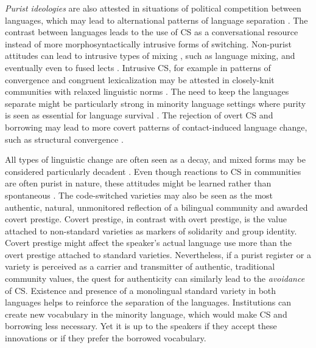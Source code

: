 \documentclass[output=paper,
modfonts
]{langscibook}
\begin{document}
\textit{Purist ideologies} are also attested in situations of political competition between languages, which may lead to alternational patterns of language separation \parencite{muysken2013language}. The contrast between languages leads to the use of CS as a conversational resource \parencite{poplack1988contrasting,auer1999codeswitching} instead of more morphosyntactically intrusive forms of switching. Non-purist attitudes can lead to intrusive types of mixing \parencite{poplack1988contrasting}, such as language mixing, and eventually even to fused lects \parencite{auer1999codeswitching}. Intrusive CS, for example in patterns of convergence and congruent lexicalization may be attested in closely-knit communities with relaxed linguistic norms \parencite{muysken2013language}. The need to keep the languages separate might be particularly strong in minority language settings where purity is seen as essential for language survival \parencite{woolard1998introduction,jaffe2007discourses}. The rejection of overt CS and borrowing may lead to more covert patterns of contact-induced language change, such as structural convergence \parencite[pp. 267]{aikhenvald2002language}. 

All types of linguistic change are often seen as a decay, and mixed forms may be considered particularly decadent \parencite{woolard1998introduction}. Even though reactions to CS in communities are often purist in nature, these attitudes might be learned rather than spontaneous \parencite[pp. 81--82]{gardner2009code}. The code-switched varieties may also be seen as the most authentic, natural, unmonitored reflection of a bilingual community \parencite{lantto2016conversations} and awarded covert prestige. Covert prestige, in contrast with overt prestige, is the value attached to non-standard varieties as markers of solidarity and group identity. Covert prestige might affect the speaker's actual language use more than the overt prestige attached to standard varieties. Nevertheless, if a purist register or a variety is perceived as a carrier and transmitter of authentic, traditional community values, the quest for authenticity can similarly lead to the \textit{avoidance} of CS. Existence and presence of a monolingual standard variety in both languages helps to reinforce the separation of the languages. Institutions can create new vocabulary in the minority language, which would make CS and borrowing less necessary. Yet it is up to the speakers if they accept these innovations or if they prefer the borrowed vocabulary.
\end{document}
